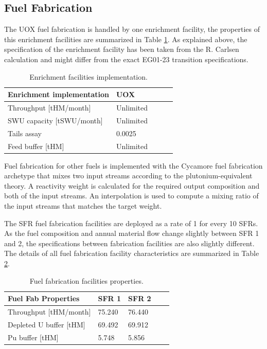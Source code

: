\documentclass[12pt]{article}
\begin{document}
\subsection{Fuel Fabrication}

The UOX fuel fabrication is handled by one enrichment facility, the properties
of this enrichment facilities are summarized in Table \ref{tab:enrich_1}. As
explained above, the specification of the enrichment facility has been taken from the
R. Carlsen calculation and might differ from the exact EG01-23 transition
specifications. 

\begin{table}[h!]
    \centering
    \begin{tabular}{lllll}
    \hline
    Enrichment implementation  &  UOX        \\
    \hline
    Throughput [tHM/month]     &  Unlimited  \\
    SWU capacity [tSWU/month]  &  Unlimited  \\
    Tails assay                &  0.0025     \\
    Feed buffer [tHM]          &  Unlimited  \\
    \hline
    \end{tabular}
    \caption{Enrichment facilities implementation. }
    \label{tab:enrich_1}
\end{table}

Fuel fabrication for other fuels is implemented with the Cycamore fuel
fabrication archetype that mixes two input streams according to the
plutonium-equivalent theory\cite{Pueq}. A reactivity weight is calculated for
the required output composition and both of the input streams. An interpolation
is used to compute a mixing ratio of the input streams that matches the target
weight.


The SFR fuel fabrication facilities are deployed as a rate of 1 for every 10
SFRs.  As the fuel composition and annual material flow change slightly between
SFR 1 and 2, the specifications between fabrication facilities are also slightly
different. The details of all fuel fabrication facility characteristics are
summarized in Table \ref{tab:fuelfab_1}.

\begin{table}[h!]
    \centering
    \begin{tabular}{lllll}
    \hline
    Fuel Fab Properties      &  SFR 1   &  SFR 2   \\
    \hline
    Throughput [tHM/month]   &  75.240  &  76.440  \\
    Depleted U buffer [tHM]  &  69.492  &  69.912  \\
    Pu buffer  [tHM]         &  5.748   &  5.856   \\
    \hline
    \end{tabular}
    \caption{Fuel fabrication facilities properties.}
    \label{tab:fuelfab_1}
\end{table}
\end{document}
